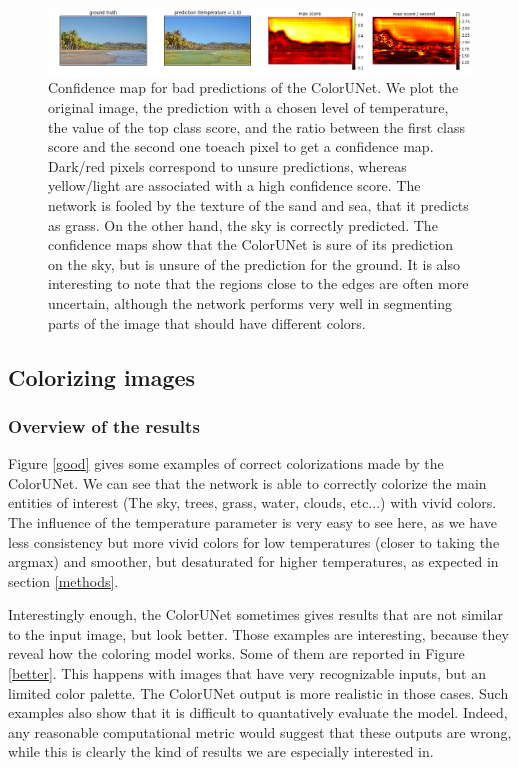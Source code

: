 \documentclass[10pt,twocolumn,letterpaper]{article}
\begin{document}
\begin{figure}
\begin{center}
\includegraphics[width=450px]{confidence}
\caption{Confidence map for bad predictions of the ColorUNet. We plot the original image, the prediction with a chosen level of temperature, the value of the top class score, and the ratio between the first class score and the second one toeach pixel to get a confidence map. Dark/red pixels correspond to unsure predictions, whereas yellow/light are associated with a high confidence score. The network is fooled by the texture of the sand and sea, that it predicts as grass. On the other hand, the sky is correctly predicted. The confidence maps show that the ColorUNet is sure of its prediction on the sky, but is unsure of the prediction for the ground. It is also interesting to note that the regions close to the edges are often more uncertain, although the network performs very well in segmenting parts of the image that should have different colors.}
\label{confidence}
\end{center}
\end{figure}
\subsection{Colorizing images}
\subsubsection{Overview of the results}

Figure \ref{good} gives some examples of correct colorizations made by the ColorUNet. We can see that the network is able to correctly colorize the main entities of interest (The sky, trees, grass, water, clouds, etc...) with vivid colors. The influence of the temperature parameter is very easy to see here, as we have less consistency but more vivid colors for low temperatures (closer to taking the argmax) and smoother, but desaturated for higher temperatures, as expected in section \ref{methods}.

Interestingly enough, the ColorUNet sometimes gives results that are not similar to the input image, but look better. Those examples are interesting, because they reveal how the coloring model works. Some of them are reported in Figure \ref{better}. This happens with images that have very recognizable inputs, but an limited color palette. The ColorUNet output is more realistic in those cases.
Such examples also show that it is difficult to quantatively evaluate the model. Indeed, any reasonable computational metric would suggest that these outputs are wrong, while this is clearly the kind of results we are especially interested in.
\end{document}
